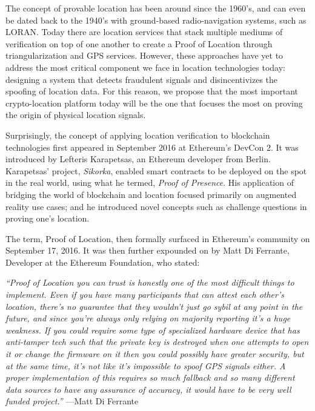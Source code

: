 \documentclass{article}
\begin{document}
The concept of provable location has been around since the 1960's, and can even be dated back to the 1940's with ground-based radio-navigation systems, such as LORAN. Today there are location services that stack multiple mediums of verification on top of one another to create a Proof of Location through triangularization and GPS services. However, these approaches have yet to address the most critical component we face in location technologies today: designing a system that detects fraudulent signals and disincentivizes the spoofing of location data. For this reason, we propose that the most important crypto-location platform today will be the one that focuses the most on proving the origin of physical location signals.

Surprisingly, the concept of applying location verification to blockchain technologies first appeared in September 2016 at Ethereum's DevCon 2. It was introduced by Lefteris Karapetsas, an Ethereum developer from Berlin. Karapetsas' project, \textit{Sikorka}, enabled smart contracts to be deployed on the spot in the real world, using what he termed, \textit{Proof of Presence}. His application of bridging the world of blockchain and location focused primarily on augmented reality use cases; and he introduced novel concepts such as challenge questions in proving one's location.

The term, Proof of Location, then formally surfaced in Ethereum's community on September 17, 2016. It was then further expounded on by Matt Di Ferrante, Developer at the Ethereum Foundation, who stated:


\begin{displayquote}\textit{``Proof of Location you can trust is honestly one of the most difficult things to implement. Even if you have many participants that can attest each other's location, there's no guarantee that they wouldn't just go sybil at any point in the future, and since you're always only relying on majority reporting it's a huge weakness.
If you could require some type of specialized hardware device that has anti-tamper tech such that the private key is destroyed when one attempts to open it or change the firmware on it then you could possibly have greater security, but at the same time, it's not like it's impossible to spoof GPS signals either.
A proper implementation of this requires so much fallback and so many different data sources to have any assurance of accuracy, it would have to be very well funded project.''}
\vspace{2mm}
---Matt Di Ferrante
\end{displayquote}
\end{document}
